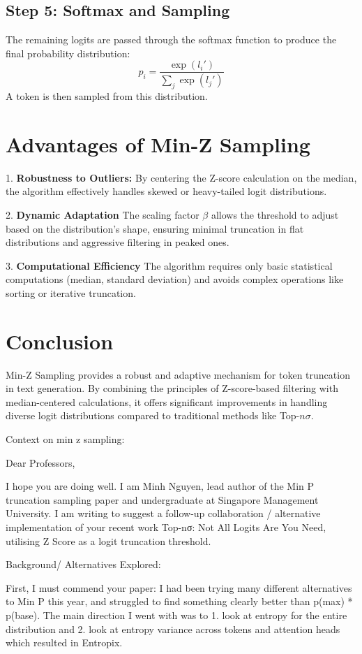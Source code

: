\documentclass{article}
\begin{document}
\subsection*{Step 5: Softmax and Sampling}
The remaining logits are passed through the softmax function to produce the final probability distribution:
\[
p_i = \frac{\exp(l_i')}{\sum_j \exp(l_j')}
\]
A token is then sampled from this distribution.

\section*{Advantages of Min-Z Sampling}
1. \textbf{Robustness to Outliers:} By centering the Z-score calculation on the median, the algorithm effectively handles skewed or heavy-tailed logit distributions.

2. \textbf{Dynamic Adaptation} The scaling factor \( \beta \) allows the threshold to adjust based on the distribution's shape, ensuring minimal truncation in flat distributions and aggressive filtering in peaked ones.

3. \textbf{Computational Efficiency} The algorithm requires only basic statistical computations (median, standard deviation) and avoids complex operations like sorting or iterative truncation.

\section*{Conclusion}
Min-Z Sampling provides a robust and adaptive mechanism for token truncation in text generation. By combining the principles of Z-score-based filtering with median-centered calculations, it offers significant improvements in handling diverse logit distributions compared to traditional methods like Top-\( n\sigma \).



Context on min z sampling:

Dear Professors,


I hope you are doing well. I am Minh Nguyen, lead author of the Min P truncation sampling paper and undergraduate at Singapore Management University. I am writing to suggest a follow-up collaboration / alternative implementation of your recent work Top-nσ: Not All Logits Are You Need, utilising Z Score as a logit truncation threshold.


Background/ Alternatives Explored:

First, I must commend your paper: I had been trying many different alternatives to Min P this year, and struggled to find something clearly better than p(max) * p(base). The main direction I went with was to 1. look at entropy for the entire distribution and 2. look at entropy variance across tokens and attention heads which resulted in Entropix.
\end{document}
